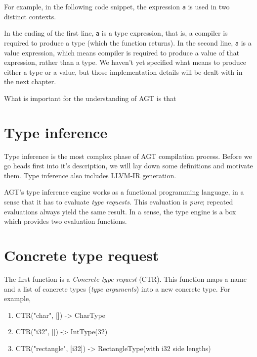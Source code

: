 \documentclass[times, utf8, diplomski]{fer}
\theoremstyle{definition}
\begin{document}
For example, in the following code snippet, the expression \texttt{a} is used in two distinct contexts.



In the ending of the first line, \texttt{a} is a type expression, that is, a compiler is required to produce
a type (which the function returns). In the second line, \texttt{a} is a value expression,
which means compiler is required to produce a value of that expression, rather than a type.
We haven't yet specified what means to produce either a type or a value, but those implementation
details will be dealt with in the next chapter.

What is important for the understanding of AGT is that 







\section{Type inference}

Type inference is the most complex phase of AGT compilation process.
Before we go heads first into it's description, we will lay down some definitions
and motivate them. Type inference also includes LLVM-IR generation. 

AGT's type inference engine works as a functional programming language,
in a sense that it has to evaluate \textit{type requests}.
This evaluation is \textit{pure}; repeated evaluations always yield the same result.
In a sense, the type engine is a box which provides two evaluation functions.

\section{Concrete type request}

The first function is a \textit{Concrete type request} (CTR). This function maps
a name and a list of concrete types (\textit{type arguments}) into a new concrete type. For example,

\begin{enumerate}
    \item CTR("char", []) -> CharType
    \item CTR("i32", []) -> IntType(32)
    \item CTR("rectangle", [i32]) -> RectangleType(with i32 side lengths)
\end{enumerate}
\end{document}
